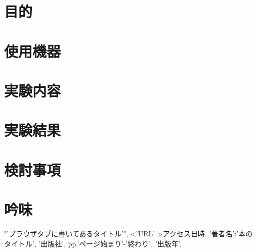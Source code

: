 \documentclass[uplatex, a4paper, 11pt]{jsarticle}
\begin{document}
\section{目的}

\section{使用機器}

\section{実験内容}

\section{実験結果}

\section{検討事項}

\section{吟味}

\begin{thebibliography}{9} %
     "'ブラウザタブに書いてあるタイトル'", \textless 'URL' \textgreater アクセス日時.
     '著者名':'本のタイトル', '出版社', pp.'ページ始まり'-'終わり', '出版年'.
\end{thebibliography}
\end{document}
